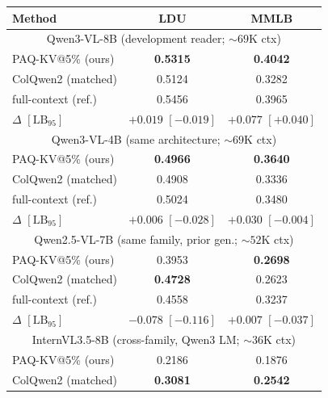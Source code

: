 \documentclass[letterpaper]{article} %
\newcommand{\paqc}{\textsc{PAQ-KV}}
\newcommand{\lb}{\mathrm{LB}_{95}}
\begin{document}
\begin{table}[t]
\centering\small
\setlength{\tabcolsep}{3pt}%
\begin{tabular}{lcc}
\toprule
Method & LDU & MMLB \\
\midrule
\multicolumn{3}{c}{Qwen3-VL-8B (development reader; ${\sim}69$K ctx)} \\
\midrule
\paqc{}@5\% (ours) & \textbf{0.5315} & \textbf{0.4042} \\
ColQwen2 (matched) & 0.5124 & 0.3282 \\
full-context (ref.) & 0.5456 & 0.3965 \\
$\Delta$ $[\lb]$ & $+0.019$ $[-0.019]$ & $+0.077$ $[+0.040]$ \\
\midrule
\multicolumn{3}{c}{Qwen3-VL-4B (same architecture; ${\sim}69$K ctx)} \\
\midrule
\paqc{}@5\% (ours) & \textbf{0.4966} & \textbf{0.3640} \\
ColQwen2 (matched) & 0.4908 & 0.3336 \\
full-context (ref.) & 0.5024 & 0.3480 \\
$\Delta$ $[\lb]$ & $+0.006$ $[-0.028]$ & $+0.030$ $[-0.004]$ \\
\midrule
\multicolumn{3}{c}{Qwen2.5-VL-7B (same family, prior gen.; ${\sim}52$K ctx)} \\
\midrule
\paqc{}@5\% (ours) & 0.3953 & \textbf{0.2698} \\
ColQwen2 (matched) & \textbf{0.4728} & 0.2623 \\
full-context (ref.) & 0.4558 & 0.3237 \\
$\Delta$ $[\lb]$ & $-0.078$ $[-0.116]$ & $+0.007$ $[-0.037]$ \\
\midrule
\multicolumn{3}{c}{InternVL3.5-8B (cross-family, Qwen3 LM; ${\sim}36$K ctx)} \\
\midrule
\paqc{}@5\% (ours) & 0.2186 & 0.1876 \\
ColQwen2 (matched) & \textbf{0.3081} & \textbf{0.2542} \\

\end{tabular}
\end{table}
\end{document}
